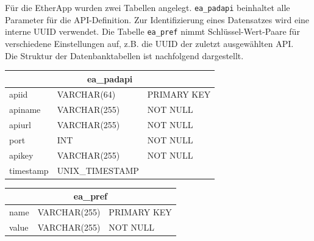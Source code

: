 Für die EtherApp wurden zwei Tabellen angelegt.
\texttt{ea\_padapi} beinhaltet alle Parameter für die API-Definition.
Zur Identifizierung eines Datensatzes wird eine interne UUID verwendet.
Die Tabelle \texttt{ea\_pref} nimmt Schlüssel-Wert-Paare für verschiedene Einstellungen auf, z.B. die UUID der zuletzt ausgewählten API.\\
Die Struktur der Datenbanktabellen ist nachfolgend dargestellt.

\begin{table}[h!]
	\begin{center}
		\footnotesize
		\begin{tabular}{|p{2.5cm}|p{3.5cm}|p{3cm}|}
			\hline
			\multicolumn{3}{|c|}{\textbf{ea\_padapi}} \\ \hline
			\hline
			apiid 	& VARCHAR(64) 	& PRIMARY KEY \\ \hline
			apiname	& VARCHAR(255) 	& NOT NULL \\ \hline
			apiurl 	& VARCHAR(255) 	& NOT NULL \\ \hline
			port	& INT 			& NOT NULL \\ \hline
			apikey	& VARCHAR(255)	& NOT NULL \\ \hline
			timestamp & UNIX\_TIMESTAMP	&  \\ \hline
		\end{tabular}
	\end{center}
\end{table}

\begin{table}[h!]
	\begin{center}
		\footnotesize
		\begin{tabular}{|p{2.5cm}|p{3.5cm}|p{3cm}|}
			\hline
			\multicolumn{3}{|c|}{\textbf{ea\_pref}} \\ \hline
			\hline
			name 	& VARCHAR(255) 	& PRIMARY KEY \\ \hline
			value 	& VARCHAR(255) 	& NOT NULL \\ \hline
		\end{tabular}
	\end{center}
\end{table}


